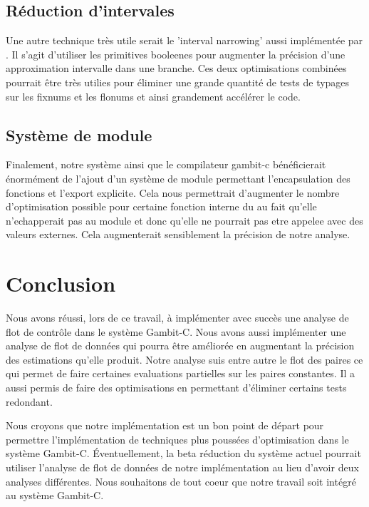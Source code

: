 \subsection{Réduction d'intervales}

Une autre technique très utile serait le 'interval narrowing' aussi
implémentée par \cite{boucher2000}.  Il s'agit d'utiliser les
primitives booleenes pour augmenter la précision d'une approximation
intervalle dans une branche. Ces deux optimisations combinées pourrait
être très utilies pour éliminer une grande quantité de tests de
typages sur les fixnums et les flonums et ainsi grandement accélérer
le code.

\subsection{Système de module}

Finalement, notre système ainsi que le compilateur gambit-c
bénéficierait énormément de l'ajout d'un système de module permettant
l'encapsulation des fonctions et l'export explicite. Cela nous
permettrait d'augmenter le nombre d'optimisation possible pour
certaine fonction interne du au fait qu'elle n'echapperait pas au
module et donc qu'elle ne pourrait pas etre appelee avec des valeurs
externes. Cela augmenterait sensiblement la précision de notre
analyse.

\clearpage

\section{Conclusion}

Nous avons réussi, lors de ce travail, à implémenter avec succès une
analyse de flot de contrôle dans le système Gambit-C. Nous avons aussi
implémenter une analyse de flot de données qui pourra être améliorée
en augmentant la précision des estimations qu'elle produit. Notre
analyse suis entre autre le flot des paires ce qui permet de faire
certaines evaluations partielles sur les paires constantes. Il a aussi
permis de faire des optimisations en permettant d'éliminer certains
tests redondant.

Nous croyons que notre implémentation est un bon point de départ pour
permettre l'implémentation de techniques plus poussées d'optimisation
dans le système Gambit-C. Éventuellement, la beta réduction du système
actuel pourrait utiliser l'analyse de flot de données de notre
implémentation au lieu d'avoir deux analyses différentes. Nous
souhaitons de tout coeur que notre travail soit intégré au système
Gambit-C.
